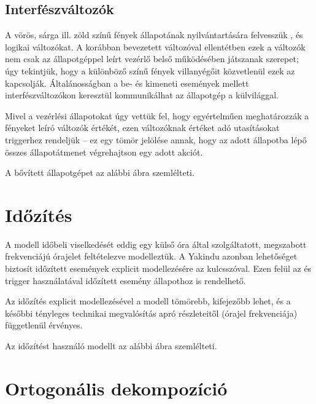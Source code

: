 \subsection{Interfészváltozók}

A vörös, sárga ill. zöld színű fények állapotának nyilvántartására felvesszük ,  és  logikai változókat. A korábban bevezetett  változóval ellentétben ezek a változók nem csak az állapotgéppel leírt vezérlő belső működésében játszanak szerepet; úgy tekintjük, hogy a különböző színű fények villanyégőit közvetlenül ezek az  kapcsolják. Általánosságban a be- és kimeneti események mellett interfészváltozókon keresztül kommunikálhat az állapotgép a külvilággal.

Mivel a vezérlési állapotokat úgy vettük fel, hogy egyértelműen meghatározzák a fényeket leíró változók értékét, ezen változóknak értéket adó utasításokat  triggerhez rendeljük -- ez egy tömör jelölése annak, hogy az adott állapotba lépő összes állapotátmenet végrehajtson egy adott akciót.

A bővített állapotgépet az alábbi ábra szemlélteti.


\section{Időzítés}

A modell időbeli viselkedését eddig egy külső óra által szolgáltatott, megszabott frekvenciájú órajelet feltételezve modelleztük. A Yakindu azonban lehetőséget biztosít időzített események explicit modellezésére az  kulcsszóval. Ezen felül az  és  trigger használatával időzített esemény állapothoz is rendelhető.

Az időzítés explicit modellezésével a modell tömörebb, kifejezőbb lehet, és a későbbi tényleges technikai megvalósítás apró részleteitől (órajel frekvenciája) függetlenül érvényes.

Az időzítést használó modellt az alábbi ábra szemlélteti.


\section{Ortogonális dekompozíció}

